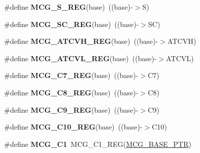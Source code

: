 \begin{DoxyCompactItemize}
\#define {\bfseries M\+C\+G\+\_\+\+S\+\_\+\+R\+EG}(base)~((base)-\/$>$S)
\item 
\mbox{\label{group___m_c_g___register___accessor___macros_gaccd64981395ccd3872a484806162a8ac}} 
\#define {\bfseries M\+C\+G\+\_\+\+S\+C\+\_\+\+R\+EG}(base)~((base)-\/$>$SC)
\item 
\mbox{\label{group___m_c_g___register___accessor___macros_gaca17ff8b94752a7700acc7adc7e462ea}} 
\#define {\bfseries M\+C\+G\+\_\+\+A\+T\+C\+V\+H\+\_\+\+R\+EG}(base)~((base)-\/$>$A\+T\+C\+VH)
\item 
\mbox{\label{group___m_c_g___register___accessor___macros_gae8da97d512d94aa7026889ca0aadedbf}} 
\#define {\bfseries M\+C\+G\+\_\+\+A\+T\+C\+V\+L\+\_\+\+R\+EG}(base)~((base)-\/$>$A\+T\+C\+VL)
\item 
\mbox{\label{group___m_c_g___register___accessor___macros_ga539e138338d19786d39052d096896e96}} 
\#define {\bfseries M\+C\+G\+\_\+\+C7\+\_\+\+R\+EG}(base)~((base)-\/$>$C7)
\item 
\mbox{\label{group___m_c_g___register___accessor___macros_ga9d7e2b88a408a722f0b7f64a7a32af01}} 
\#define {\bfseries M\+C\+G\+\_\+\+C8\+\_\+\+R\+EG}(base)~((base)-\/$>$C8)
\item 
\mbox{\label{group___m_c_g___register___accessor___macros_ga4edaa0cc446f810f9aa01a41f6960573}} 
\#define {\bfseries M\+C\+G\+\_\+\+C9\+\_\+\+R\+EG}(base)~((base)-\/$>$C9)
\item 
\mbox{\label{group___m_c_g___register___accessor___macros_gaf22ce39beaaebd71b3d675a11ed7fb0b}} 
\#define {\bfseries M\+C\+G\+\_\+\+C10\+\_\+\+R\+EG}(base)~((base)-\/$>$C10)
\item 
\mbox{\label{group___m_c_g___register___accessor___macros_ga3f1a2c81a59d97251a06534341ad3303}} 
\#define {\bfseries M\+C\+G\+\_\+\+C1}~M\+C\+G\+\_\+\+C1\+\_\+\+R\+EG(\hyperlink{group___m_c_g___peripheral_gaceefc72e93a47a35f59a31c57dddf41b}{M\+C\+G\+\_\+\+B\+A\+S\+E\+\_\+\+P\+TR})

\end{DoxyCompactItemize}
